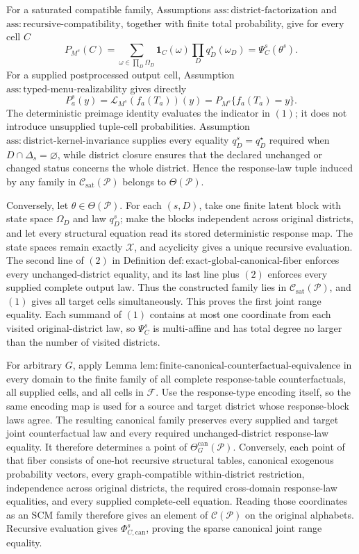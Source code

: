 For a saturated compatible family, Assumptions \(\mathrm{ass:district\text{-}factorization}\) and \(\mathrm{ass:recursive\text{-}compatibility}\), together with finite total probability, give for every cell \(C\)
\[
P_{M^s}(C)=
\sum_{\omega\in\prod_D\Omega_D}
\mathbf 1_C(\omega)\prod_Dq_D^s(\omega_D)
=\Psi_C^s(\theta^s).
\tag{1}
\]
For a supplied postprocessed output cell, Assumption \(\mathrm{ass:typed\text{-}menu\text{-}realizability}\) gives directly
\[
P_a^s(y)=\mathcal L_{M^s}(f_a(T_a))(y)
=P_{M^s}\{f_a(T_a)=y\}.
\tag{2}
\]
The deterministic preimage identity evaluates the indicator in \((1)\); it does not introduce unsupplied tuple-cell probabilities.  Assumption \(\mathrm{ass:district\text{-}kernel\text{-}invariance}\) supplies every equality \(q_D^s=q_D^\star\) required when \(D\cap\Delta_s=\varnothing\), while district closure ensures that the declared unchanged or changed status concerns the whole district.  Hence the response-law tuple induced by any family in \(\mathcal C_{\mathrm{sat}}(\mathcal P)\) belongs to \(\Theta(\mathcal P)\).

Conversely, let \(\theta\in\Theta(\mathcal P)\).  For each \((s,D)\), take one finite latent block with state space \(\Omega_D\) and law \(q_D^s\); make the blocks independent across original districts, and let every structural equation read its stored deterministic response map.  The state spaces remain exactly \(\mathcal X\), and acyclicity gives a unique recursive evaluation.  The second line of \((2)\) in Definition \(\mathrm{def:exact\text{-}global\text{-}canonical\text{-}fiber}\) enforces every unchanged-district equality, and its last line plus \((2)\) enforces every supplied complete output law.  Thus the constructed family lies in \(\mathcal C_{\mathrm{sat}}(\mathcal P)\), and \((1)\) gives all target cells simultaneously.  This proves the first joint range equality.  Each summand of \((1)\) contains at most one coordinate from each visited original-district law, so \(\Psi_C^s\) is multi-affine and has total degree no larger than the number of visited districts.

For arbitrary \(G\), apply Lemma \(\mathrm{lem:finite\text{-}canonical\text{-}counterfactual\text{-}equivalence}\) in every domain to the finite family of all complete response-table counterfactuals, all supplied cells, and all cells in \(\mathcal F\).  Use the response-type encoding itself, so the same encoding map is used for a source and target district whose response-block laws agree.  The resulting canonical family preserves every supplied and target joint counterfactual law and every required unchanged-district response-law equality.  It therefore determines a point of \(\Theta_G^{\mathrm{can}}(\mathcal P)\).  Conversely, each point of that fiber consists of one-hot recursive structural tables, canonical exogenous probability vectors, every graph-compatible within-district restriction, independence across original districts, the required cross-domain response-law equalities, and every supplied complete-cell equation.  Reading those coordinates as an SCM family therefore gives an element of \(\mathcal C(\mathcal P)\) on the original alphabets.  Recursive evaluation gives \(\Phi_{C,\mathrm{can}}^s\), proving the sparse canonical joint range equality.

